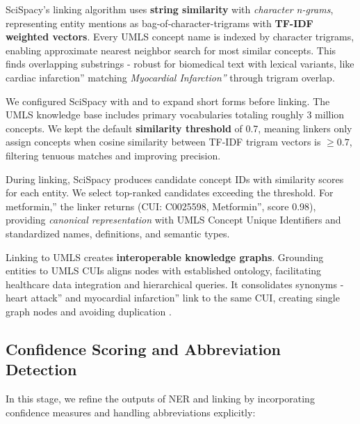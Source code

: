 SciSpacy's linking algorithm uses \textbf{string similarity} with \textit{character n-grams}, representing entity mentions as bag-of-character-trigrams with \textbf{TF-IDF weighted vectors}. Every UMLS concept name is indexed by character trigrams, enabling approximate nearest neighbor search for most similar concepts. This finds overlapping substrings - robust for biomedical text with lexical variants, like cardiac infarction'' matching \textit{Myocardial Infarction''} through trigram overlap.

We configured SciSpacy with \texttt{} and \texttt{} to expand short forms before linking. The UMLS knowledge base includes primary vocabularies totaling roughly 3 million concepts. We kept the default \textbf{similarity threshold} of 0.7, meaning linkers only assign concepts when cosine similarity between TF-IDF trigram vectors is $\geq 0.7$, filtering tenuous matches and improving precision.

During linking, SciSpacy produces candidate concept IDs with similarity scores for each entity. We select top-ranked candidates exceeding the threshold. For metformin,'' the linker returns (CUI: C0025598, Metformin'', score 0.98), providing \textit{canonical representation} with UMLS Concept Unique Identifiers and standardized names, definitions, and semantic types.

Linking to UMLS creates \textbf{interoperable knowledge graphs}. Grounding entities to UMLS CUIs aligns nodes with established ontology, facilitating healthcare data integration and hierarchical queries. It consolidates synonyms - heart attack'' and myocardial infarction'' link to the same CUI, creating single graph nodes and avoiding duplication \parencite{UMLS2024}.

\subsection{Confidence Scoring and Abbreviation Detection}
\label{sec:confidence}

In this stage, we refine the outputs of NER and linking by incorporating confidence measures and handling abbreviations explicitly:

